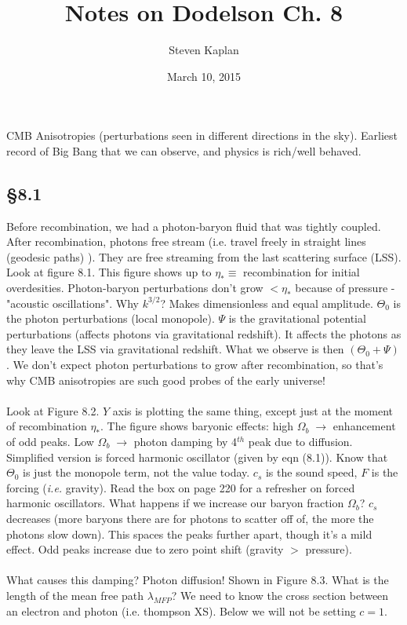 \documentclass[12pt]{article}
\title{Notes on Dodelson Ch. 8}
\author{Steven Kaplan}
\date{March 10, 2015}
\begin{document}
\maketitle
\noindent
CMB Anisotropies (perturbations seen in different directions in the sky).  Earliest record of Big Bang that we can observe, and physics is rich/well behaved.
\subsection*{\S8.1}
Before recombination, we had a photon-baryon fluid that was tightly coupled.  After recombination, photons free stream (i.e. travel freely in straight lines (geodesic paths) ).  They are free streaming from the last scattering surface (LSS).  Look at figure 8.1.  This figure shows up to $\eta_*\equiv$ recombination for initial overdesities.  Photon-baryon perturbations don't grow $<\eta_*$ because of pressure - "acoustic oscillations".  Why $k^{3/2}$?  Makes dimensionless and equal amplitude.  $\Theta_0$ is the photon perturbations (local monopole).  $\Psi$ is the gravitational potential perturbations (affects photons via gravitational redshift).  It affects the photons as they leave the LSS via gravitational redshift.  What we observe is then $(\Theta_0+\Psi)$.  We don't expect photon perturbations to grow after recombination, so that's why CMB anisotropies are such good probes of the early universe!
\\ \\
Look at Figure 8.2.  $Y$ axis is plotting the same thing, except just at the moment of recombination $\eta_*$.  The figure shows baryonic effects: high $\Omega_b\;\rightarrow$ enhancement of odd peaks.  Low $\Omega_b\;\rightarrow$ photon damping by 4$^{th}$ peak due to diffusion.  Simplified version is forced harmonic oscillator (given by eqn (8.1)).  Know that $\Theta_0$ is just the monopole term, not the value today.  $c_s$ is the sound speed, $F$ is the forcing (\emph{i.e.} gravity).  Read the box on page 220 for a refresher on forced harmonic oscillators.  What happens if we increase our baryon fraction $\Omega_b$?  $c_s$ decreases (more baryons there are for photons to scatter off of, the more the photons slow down).  This spaces the peaks further apart, though it's a mild effect.  Odd peaks increase due to zero point shift (gravity $>$ pressure).
\\ \\
What causes this damping?  Photon diffusion!  Shown in Figure 8.3.  What is the length of the mean free path $\lambda_{MFP}$?  We need to know the cross section between an electron and photon (i.e. thompson XS).  Below we will not be setting $c=1$.
\end{document}
